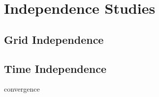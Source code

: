 \section{Independence Studies}

\subsection{Grid Independence}



\subsection{Time Independence}



convergence